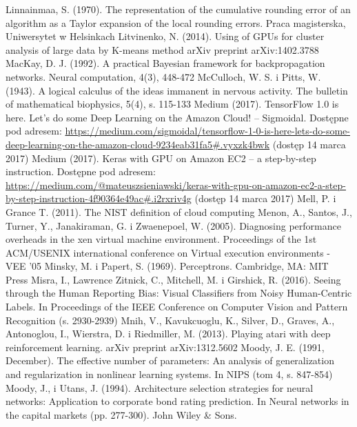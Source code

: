 \documentclass[12pt,a4paper,twoside]{article}
\begin{document}
\begin{thebibliography}{99}
 Linnainmaa, S. (1970). The representation of the cumulative rounding error of an algorithm as a
Taylor expansion of the local rounding errors. Praca magisterska, Uniwersytet w Helsinkach
 Litvinenko, N. (2014). Using of GPUs for cluster analysis of large data by K-means method arXiv preprint arXiv:1402.3788
 MacKay, D. J. (1992). A practical Bayesian framework for backpropagation networks. Neural computation, 4(3), 448-472
 McCulloch, W. S. i Pitts, W. (1943). A logical calculus of the ideas immanent in nervous activity. The bulletin of mathematical biophysics, 5(4), s. 115-133
 Medium (2017). TensorFlow 1.0 is here. Let’s do some Deep Learning on the Amazon Cloud! – Sigmoidal. Dostępne pod adresem: \url{https://medium.com/sigmoidal/tensorflow-1-0-is-here-lets-do-some-deep-learning-on-the-amazon-cloud-9234eab31fa5#.vyxzk4bwk} (dostęp 14 marca 2017)
 Medium (2017). Keras with GPU on Amazon EC2 – a step-by-step instruction. Dostępne pod adresem: \url{https://medium.com/@mateuszsieniawski/keras-with-gpu-on-amazon-ec2-a-step-by-step-instruction-4f90364e49ac#.i2rxriv4g} (dostęp 14 marca 2017)
 Mell, P. i Grance T. (2011). The NIST definition of cloud computing
 Menon, A., Santos, J., Turner, Y., Janakiraman, G. i Zwaenepoel, W. (2005). Diagnosing performance overheads in the xen virtual machine environment. Proceedings of the 1st ACM/USENIX international conference on Virtual execution environments - VEE '05
 Minsky, M. i Papert, S. (1969). Perceptrons. Cambridge, MA: MIT Press
 Misra, I., Lawrence Zitnick, C., Mitchell, M. i Girshick, R. (2016). Seeing through the Human Reporting Bias: Visual Classifiers from Noisy Human-Centric Labels. In Proceedings of the IEEE Conference on Computer Vision and Pattern Recognition (s. 2930-2939)
 Mnih, V., Kavukcuoglu, K., Silver, D., Graves, A., Antonoglou, I., Wierstra, D. i Riedmiller, M. (2013). Playing atari with deep reinforcement learning. arXiv preprint arXiv:1312.5602
 Moody, J. E. (1991, December). The effective number of parameters: An analysis of generalization and regularization in nonlinear learning systems. In NIPS (tom 4, s. 847-854)
 Moody, J., i Utans, J. (1994). Architecture selection strategies for neural networks: Application to corporate bond rating prediction. In Neural networks in the capital markets (pp. 277-300). John Wiley \& Sons.

\end{thebibliography}
\end{document}
